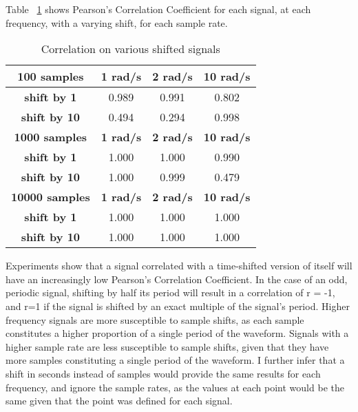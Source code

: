 Table ~\ref{tab:corr} shows Pearson's Correlation Coefficient for each signal, at each frequency, with a varying shift, for each sample rate.

\begin{table}[h]
\centering
\begin{tabular}{|c|c|c|c|}
\hline
\textbf{100 samples} & \textbf{1 rad/s} & \textbf{2 rad/s} & \textbf{10 rad/s} \\ \hline
\textbf{shift by 1}  & 0.989   & 0.991   & 0.802    \\ \hline        
\textbf{shift by 10} & 0.494	  & 0.294   & 0.998    \\ \hline
\hline
\textbf{1000 samples} & \textbf{1 rad/s} & \textbf{2 rad/s} & \textbf{10 rad/s} \\ \hline
\textbf{shift by 1}  & 1.000   & 1.000   & 0.990   \\ \hline        
\textbf{shift by 10} & 1.000	  & 0.999   & 0.479    \\ \hline
\hline
\textbf{10000 samples} & \textbf{1 rad/s} & \textbf{2 rad/s} & \textbf{10 rad/s} \\ \hline
\textbf{shift by 1}  & 1.000   & 1.000   & 1.000    \\ \hline        
\textbf{shift by 10} & 1.000	  & 1.000   & 1.000    \\ \hline

\end{tabular}
\caption{Correlation on various shifted signals}
\label{tab:corr}
\end{table}


Experiments show that a signal correlated with a time-shifted version of itself will have an increasingly low Pearson's Correlation Coefficient. In the case of an odd, periodic signal, shifting by half its period will result in a correlation of r = -1, and r=1 if the signal is shifted by an exact multiple of the signal's period. Higher frequency signals are more susceptible to sample shifts, as each sample constitutes a higher proportion of a single period of the waveform. Signals with a higher sample rate are less susceptible to sample shifts, given that they have more samples constituting a single period of the waveform. 
I further infer that a shift in seconds instead of samples would provide the same results for each frequency, and ignore the sample rates, as the values at each point would be the same given that the point was defined for each signal.
